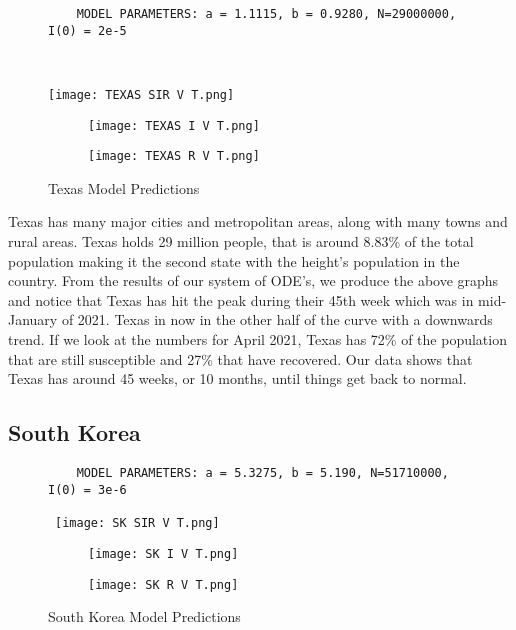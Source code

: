 \documentclass[a4paper,10pt]{article}
\begin{document}
\begin{figure}[!htb]
\centering
\begin{verbatim}
    MODEL PARAMETERS: a = 1.1115, b = 0.9280, N=29000000, I(0) = 2e-5 
\end{verbatim}\

\texttt{[image: TEXAS SIR V T.png]}
\begin{subfigure}{.5\textwidth}
  \centering
  \texttt{[image: TEXAS I V T.png]}
  \label{fig:texas1}
\end{subfigure}%
\begin{subfigure}{.5\textwidth}
  \centering
  \texttt{[image: TEXAS R V T.png]}
  \label{fig:texas2}
\end{subfigure}
\caption{Texas Model Predictions}
\label{fig:texas}
\end{figure}
\FloatBarrier
Texas has many major cities and metropolitan areas, along with many towns and rural areas. Texas holds 29 million people, that is around 8.83\% of the total population making it the second state with the height's population in the country. From the results of our system of ODE's, we produce the above graphs and notice that Texas has hit the peak during their 45th week which was in mid-January of 2021. Texas in now in the other half of the curve with a downwards trend. If we look at the numbers for  April 2021, Texas  has 72\% of the population that are still susceptible and 27\% that have recovered. Our data shows that Texas has around 45 weeks, or 10 months, until things get back to normal. 
\clearpage
\newpage
\subsection{South Korea}

\begin{figure}[!htb]
\centering
\begin{verbatim}
    MODEL PARAMETERS: a = 5.3275, b = 5.190, N=51710000, I(0) = 3e-6
\end{verbatim}\
\texttt{[image: SK SIR V T.png]}
\begin{subfigure}{.5\textwidth}
  \centering
  \texttt{[image: SK I V T.png]}
  \label{fig:sk1}
\end{subfigure}%
\begin{subfigure}{.5\textwidth}
  \centering
  \texttt{[image: SK R V T.png]}
  \label{fig:sk2}
\end{subfigure}
\caption{South Korea Model Predictions}
\label{fig:sk}
\end{figure}
\FloatBarrier
\end{document}
